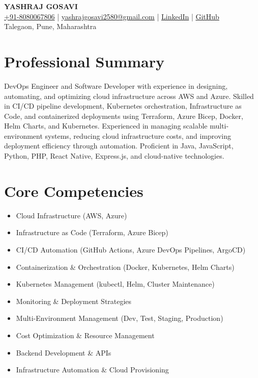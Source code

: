 \documentclass[a4paper,10pt]{article}
\begin{document}
\begin{center}
    {\LARGE \textbf{YASHRAJ GOSAVI}} \\[6pt]

    \href{tel:+918080067806}{+91-8080067806} \quad | \quad
    \href{mailto:yashrajgosavi2580@gmail.com}{yashrajgosavi2580@gmail.com} \quad | \quad
    \href{https://www.linkedin.com/in/yashraj-gosavi}{LinkedIn} \quad | \quad
    \href{https://github.com/yashrajgosavi}{GitHub} \\[4pt]

    Talegaon, Pune, Maharashtra
\end{center}

\vspace{5pt}

\section*{Professional Summary}

DevOps Engineer and Software Developer with experience in designing, automating, and optimizing cloud infrastructure across AWS and Azure. Skilled in CI/CD pipeline development, Kubernetes orchestration, Infrastructure as Code, and containerized deployments using Terraform, Azure Bicep, Docker, Helm Charts, and Kubernetes. Experienced in managing scalable multi-environment systems, reducing cloud infrastructure costs, and improving deployment efficiency through automation. Proficient in Java, JavaScript, Python, PHP, React Native, Express.js, and cloud-native technologies.

\section*{Core Competencies}

\begin{itemize}[leftmargin=*]
    \item Cloud Infrastructure (AWS, Azure)
    \item Infrastructure as Code (Terraform, Azure Bicep)
    \item CI/CD Automation (GitHub Actions, Azure DevOps Pipelines, ArgoCD)
    \item Containerization \& Orchestration (Docker, Kubernetes, Helm Charts)
    \item Kubernetes Management (kubectl, Helm, Cluster Maintenance)
    \item Monitoring \& Deployment Strategies
    \item Multi-Environment Management (Dev, Test, Staging, Production)
    \item Cost Optimization \& Resource Management
    \item Backend Development \& APIs
    \item Infrastructure Automation \& Cloud Provisioning
\end{itemize}
\end{document}
